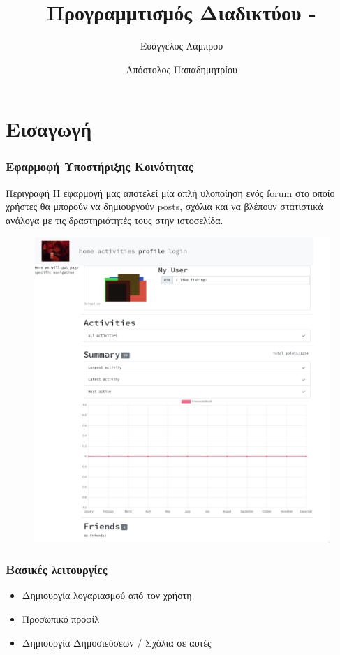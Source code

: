 \documentclass[pdf]{beamer}
\title{Προγραμμτισμός Διαδικτύου - \en{Project}}
\date{}
\author{Ευάγγελος Λάμπρου \and Απόστολος Παπαδημητρίου}
\newcommand{\en}[1]{\foreignlanguage{english}{#1}}
\begin{document}
\begin{frame}
    \maketitle
\end{frame}

\section{Εισαγωγή}

\begin{frame}
    \frametitle{Εφαρμοφή Υποστήριξης Κοινότητας}

    \begin{block}{Περιγραφή}
        Η εφαρμογή μας αποτελεί μία απλή υλοποίηση ενός 
        \en{forum} στο οποίο χρήστες θα μπορούν να δημιουργούν
        \en{posts}, σχόλια και να βλέπουν στατιστικά ανάλογα με τις 
        δραστηριότητές τους στην ιστοσελίδα.
    \end{block}
    
   \begin{figure}[htpb]
       \centering
        \includegraphics[width=.4\textwidth]{./assets/site.png}
   \end{figure} 
    
\end{frame}

\begin{frame}

    \frametitle{Βασικές λειτουργίες}

    \begin{itemize}
        \item Δημιουργία λογαριασμού από τον χρήστη
        \item Προσωπικό προφίλ
        \item Δημιουργία Δημοσιεύσεων / Σχόλια σε αυτές
    \end{itemize}
    
\end{frame}
\end{document}
